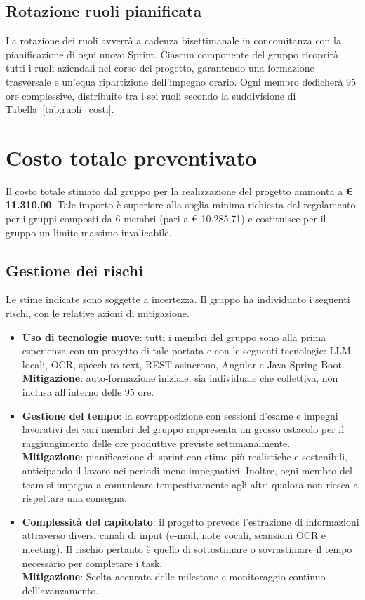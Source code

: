 \subsection{Rotazione ruoli pianificata}
La rotazione dei ruoli avverrà a cadenza bisettimanale in concomitanza con la pianificazione di ogni nuovo Sprint.
Ciascun componente del gruppo ricoprirà tutti i ruoli aziendali nel corso del progetto, garantendo una formazione trasversale e un'equa ripartizione dell'impegno orario. Ogni membro dedicherà 95 ore complessive, distribuite tra i sei ruoli secondo la suddivisione di Tabella~\ref{tab:ruoli_costi}.
\clearpage

\section{Costo totale preventivato}

Il costo totale stimato dal gruppo {\nomegruppo} per la realizzazione del progetto ammonta a \textbf{€ 11.310,00}.   Tale importo è superiore alla soglia minima richiesta dal regolamento per i gruppi composti da 6 membri (pari a € 10.285,71) e costituisce per il gruppo un limite massimo invalicabile.

\subsection{Gestione dei rischi}
Le stime indicate sono soggette a incertezza. Il gruppo ha individuato i seguenti rischi, con le relative azioni di mitigazione.
\begin{itemize}
	\item\textbf{Uso di tecnologie nuove}: tutti i membri del gruppo sono alla prima esperienza con un progetto di tale portata e con le seguenti tecnologie:    LLM locali, OCR, speech-to-text, REST asincrono, Angular e Java Spring Boot.\\
	 \textbf{Mitigazione}: auto-formazione iniziale, sia individuale che collettiva, non inclusa all'interno delle 95 ore.
	 \item \textbf{Gestione del tempo}: la sovrapposizione con sessioni d'esame e impegni lavorativi dei vari membri del gruppo rappresenta un grosso ostacolo per il raggiungimento delle ore produttive previste settimanalmente. \\
	 \textbf{Mitigazione}: pianificazione di sprint con stime più realistiche e sostenibili, anticipando il lavoro nei periodi meno impegnativi. Inoltre, ogni membro del team si impegna a comunicare tempestivamente agli altri qualora non riesca a rispettare una consegna.
	 \item \textbf{Complessità del capitolato}: il progetto prevede l'estrazione di informazioni attraverso diversi canali di input (e-mail, note vocali, scansioni OCR e meeting). Il rischio pertanto è quello di sottostimare o sovrastimare il tempo necessario per completare i task.\\
	 \textbf{Mitigazione}: Scelta accurata delle milestone e monitoraggio continuo dell'avanzamento.
\end{itemize}

